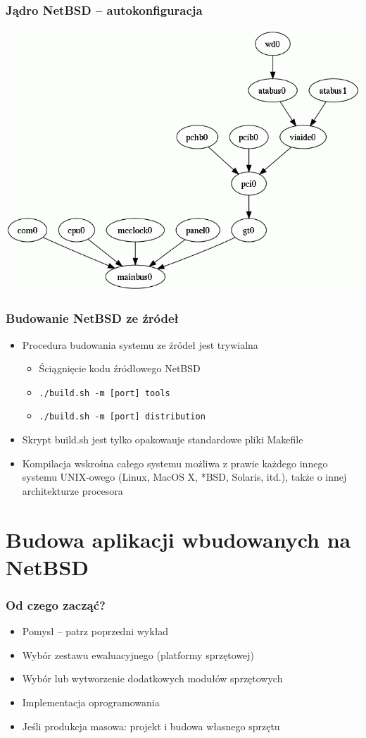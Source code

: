 \documentclass[dvipsnames,table]{beamer}
\begin{document}
\begin{frame}
\frametitle{Jądro NetBSD -- autokonfiguracja}
\begin{center}
	\includegraphics[scale=0.4]{img_cobaltdmesg.png}
\end{center}
\end{frame}

\begin{frame}
\frametitle{Budowanie NetBSD ze źródeł}
\begin{itemize}
	\item Procedura budowania systemu ze źródeł jest trywialna
	\begin{itemize}
		\item Ściągnięcie kodu źródłowego NetBSD
		\item \tt{./build.sh -m [port] tools}
		\item \tt{./build.sh -m [port] distribution}
	\end{itemize}
	\item Skrypt build.sh jest tylko opakowauje standardowe pliki Makefile
	\item Kompilacja wskrośna całego systemu możliwa z prawie każdego innego systemu UNIX-owego (Linux, MacOS X, *BSD, Solaris, itd.), także o innej architekturze procesora
\end{itemize}
\end{frame}


\section{Budowa aplikacji wbudowanych na NetBSD}

\begin{frame}
\frametitle{Od czego zacząć?}
\begin{itemize}
	\item Pomysł -- patrz poprzedni wykład {\Large \smiley}
	\item Wybór zestawu ewaluacyjnego (platformy sprzętowej)
	\item Wybór lub wytworzenie dodatkowych modułów sprzętowych
	\item Implementacja oprogramowania
	\item Jeśli produkcja masowa: projekt i budowa własnego sprzętu
\end{itemize}
\end{frame}	
\end{document}

